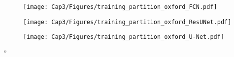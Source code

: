 \documentclass[review,12pt]{report}
\newenvironment{reviewer}{\setcounter{pointcounter}{1}}{}
\begin{document}
\begin{reviewer}
{\begin{figure}
 \centering
 \captionsetup{justification=centering}
 \begin{minipage}[b]{\textwidth}
 \centering
 \texttt{[image: Cap3/Figures/training\_partition\_oxford\_FCN.pdf]}
 \label{fig:FCN_training_size}
 \end{minipage}\vspace{0.4cm}
 
 \begin{minipage}[b]{\textwidth}
 \centering
 \texttt{[image: Cap3/Figures/training\_partition\_oxford\_ResUNet.pdf]}
 \label{fig:RESUNET_training_size}
 \end{minipage}\vspace{0.4cm}
 
 \begin{minipage}[b]{\textwidth}
 \centering
 \texttt{[image: Cap3/Figures/training\_partition\_oxford\_U-Net.pdf]}
 \label{fig:UNET_training_size}
 \end{minipage}

\end{figure}
''

}




\end{reviewer}

\clearpage




%

%

\end{document}
